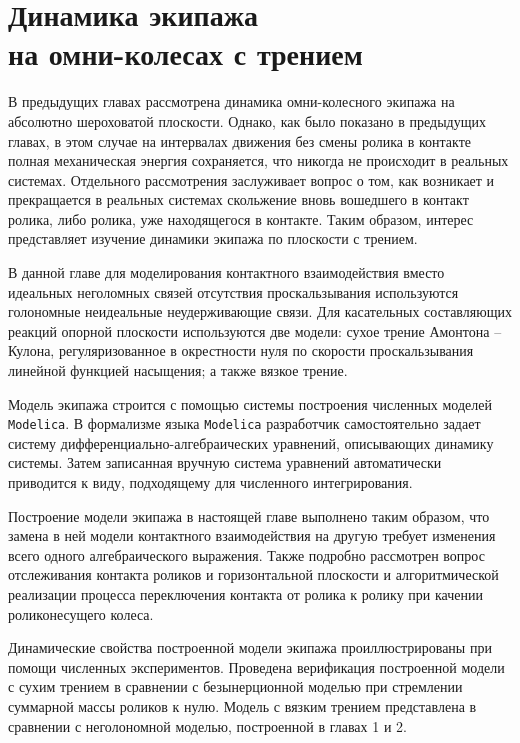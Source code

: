 \chapter{Динамика экипажа \\ на омни-колесах с трением}


В предыдущих главах рассмотрена динамика омни-колесного экипажа на абсолютно шероховатой плоскости. Однако, как было показано в предыдущих главах, в этом случае на интервалах движения без смены ролика в контакте полная механическая энергия сохраняется, что никогда не происходит в реальных системах.
Отдельного рассмотрения заслуживает вопрос о том, как возникает и прекращается в реальных системах скольжение вновь вошедшего в контакт ролика, либо ролика, уже находящегося в контакте.
Таким образом, интерес представляет изучение динамики экипажа по плоскости с трением.

В данной главе для моделирования контактного взаимодействия вместо идеальных неголомных связей отсутствия проскальзывания используются голономные неидеальные неудерживающие связи. Для касательных составляющих реакций опорной плоскости используются две модели: сухое трение Амонтона -- Кулона, регуляризованное в окрестности нуля по скорости проскальзывания линейной функцией насыщения; а также вязкое трение.

Модель экипажа строится с помощью системы построения численных моделей \texttt{Modelica}. В формализме языка \texttt{Modelica} разработчик самостоятельно задает систему дифференциально-алгебраических уравнений, описывающих динамику системы. Затем записанная вручную система уравнений автоматически приводится к виду, подходящему для численного интегрирования.

Построение модели экипажа в настоящей главе выполнено таким образом, что замена в ней модели контактного взаимодействия на другую требует изменения всего одного алгебраического выражения. Также подробно рассмотрен вопрос отслеживания контакта роликов и горизонтальной плоскости и алгоритмической реализации процесса переключения контакта от ролика к ролику при качении  роликонесущего колеса.

Динамические свойства построенной модели экипажа проиллюстрированы при помощи численных экспериментов. Проведена верификация построенной модели с сухим трением в сравнении с безынерционной моделью при стремлении суммарной массы роликов к нулю. Модель с вязким трением представлена в сравнении с неголономной моделью, построенной в главах 1 и 2.